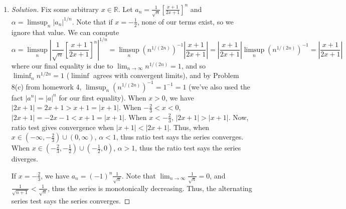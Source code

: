\documentclass{article}
\newcommand{\R}{{\mathbb R}}
\begin{document}
\begin{enumerate}
\begin{proof}[Solution]
		It remains to consider the case when $-1 < x < 0$.
		Now if $n$ is odd, we have $a_n = \frac{(-1)|x|^n(1+|x|^n)}{n}
		< \frac{-2|x|^n}{n}$.
		Since $\lim_{n\to\infty}\frac{2n}{(1/|x|)^n} = 0$ by Rudin Theorem 3.20 (d),
		we have some $N$ such that $\left(\frac{1}{|x|}\right)^n > 2n > 0$
		for all $n \geq N$,
		thus $0 < 2|x|^n < \frac{1}{n}$,
		thus $|a_n| < \frac{2|x|^n}{n} < \frac{1}{n^2}$.
		Furthermore, when $n$ is even, we have $a_n = \frac{|x|^n(1-|x|^n)}{n} < \frac{|x|^n(1 + |x|^n)}{n} < \frac{1}{n^2}$ as well.
		Thus $|a_n| < \frac{1}{n^2}$ for all $n \geq N$.
		And since $\sum_n \frac{1}{n^2}$ is a convergent $p$-series ($p > 1$),
		the comparison test tells us that $\sum_n a_n$ converges as well.

		In summary: the series converges when $x \in (-1,1]$,
		and diverges otherwise.
	\end{proof}
	\item \begin{proof}[Solution]\let\qed\relax
		Fix some arbitrary $x \in \R$.
		Let $a_n = \frac{1}{\sqrt{n}}\left[\frac{x+1}{2x+1}\right]^n$
		and $\alpha = \limsup_n|a_n|^{1/n}$.
		Note that if $x = -\frac12$, none of our terms exist,
		so we ignore that value.
		We can compute
		\[
			\alpha =
			\limsup_n \left\lvert\frac{1}{\sqrt{n}}
			\left[\frac{x+1}{2x+1}\right]^n\right\rvert^{1/n}
			= \limsup_n (n^{1/(2n)})^{-1}\left\lvert\frac{x+1}{2x+1}\right\rvert
			= \left\lvert\frac{x+1}{2x+1}\right\rvert\limsup_n(n^{1/(2n)})^{-1}
			=\left\lvert\frac{x+1}{2x+1}\right\rvert
		\]
		where our final equality is due to $\lim_{n\to\infty} n^{1/(2n)} = 1$,
		and so $\liminf_n n^{1/{2n}} = 1$ ($\liminf$ agrees with convergent limits),
		and by Problem 8(c) from homework 4,
		$\limsup_n (n^{1/(2n)})^{-1} = 1^{-1} = 1$
		(we've also used the fact $|a^n| = |a|^n$ for our first equality).
		When $x > 0$, we have $|2x+1| = 2x+1 > x+1 = |x+1|$.
		When $-\frac23 < x < 0$, $|2x+1| = -2x-1 < x+1 = |x+1|$.
		When $x < -\frac23$, $|2x+1| > |x+1|$.
		Now, ratio test gives convergence when $|x+1| < |2x+1|$.
		Thus, when $x \in (-\infty, -\frac23) \cup (0,\infty)$,
		$\alpha < 1$,
		thus ratio test says the series converges.
		When $x \in (-\frac23, -\frac12)\cup (-\frac12, 0)$,
		$\alpha > 1$, thus the ratio test says the series diverges.

		If $x = -\frac23$, we have $a_n = (-1)^n\frac{1}{\sqrt{n}}$.
		Note that $\lim_{n\to\infty} \frac{1}{\sqrt{n}} = 0$,
		and $\frac{1}{\sqrt{n+1}} < \frac{1}{\sqrt{n}}$,
		thus the series is monotonically decreasing.
		Thus, the alternating series test says the series converges.


\end{proof}
\end{enumerate}
\end{document}
